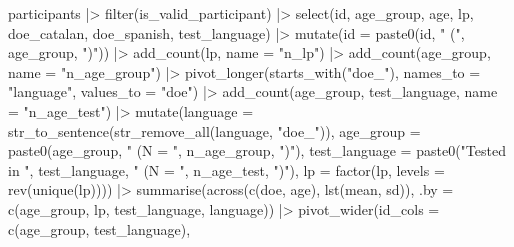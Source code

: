 \documentclass[
  letterpaper,
  DIV=11,
  numbers=noendperiod]{scrartcl}
\newenvironment{Shaded}{\begin{snugshade}}{\end{snugshade}}
\newcommand{\AttributeTok}[1]{\textcolor[rgb]{0.40,0.45,0.13}{#1}}
\newcommand{\FunctionTok}[1]{\textcolor[rgb]{0.28,0.35,0.67}{#1}}
\newcommand{\NormalTok}[1]{\textcolor[rgb]{0.00,0.23,0.31}{#1}}
\newcommand{\SpecialCharTok}[1]{\textcolor[rgb]{0.37,0.37,0.37}{#1}}
\newcommand{\StringTok}[1]{\textcolor[rgb]{0.13,0.47,0.30}{#1}}
\begin{document}
\begin{Shaded}
\begin{Highlighting}[]
\NormalTok{participants }\SpecialCharTok{|\textgreater{}} 
    \FunctionTok{filter}\NormalTok{(is\_valid\_participant) }\SpecialCharTok{|\textgreater{}} 
    \FunctionTok{select}\NormalTok{(id, age\_group, age, lp,}
\NormalTok{           doe\_catalan, doe\_spanish, test\_language) }\SpecialCharTok{|\textgreater{}} 
    \FunctionTok{mutate}\NormalTok{(}\AttributeTok{id =} \FunctionTok{paste0}\NormalTok{(id, }\StringTok{" ("}\NormalTok{, age\_group, }\StringTok{")"}\NormalTok{)) }\SpecialCharTok{|\textgreater{}}
    \FunctionTok{add\_count}\NormalTok{(lp, }
              \AttributeTok{name =} \StringTok{"n\_lp"}\NormalTok{) }\SpecialCharTok{|\textgreater{}} 
    \FunctionTok{add\_count}\NormalTok{(age\_group, }
              \AttributeTok{name =} \StringTok{"n\_age\_group"}\NormalTok{) }\SpecialCharTok{|\textgreater{}} 
    \FunctionTok{pivot\_longer}\NormalTok{(}\FunctionTok{starts\_with}\NormalTok{(}\StringTok{"doe\_"}\NormalTok{),}
                 \AttributeTok{names\_to =} \StringTok{"language"}\NormalTok{,}
                 \AttributeTok{values\_to =} \StringTok{"doe"}\NormalTok{) }\SpecialCharTok{|\textgreater{}}
    \FunctionTok{add\_count}\NormalTok{(age\_group,}
\NormalTok{              test\_language,}
              \AttributeTok{name =} \StringTok{"n\_age\_test"}\NormalTok{) }\SpecialCharTok{|\textgreater{}} 
    \FunctionTok{mutate}\NormalTok{(}\AttributeTok{language =} \FunctionTok{str\_to\_sentence}\NormalTok{(}\FunctionTok{str\_remove\_all}\NormalTok{(language, }\StringTok{"doe\_"}\NormalTok{)),}
           \AttributeTok{age\_group =} \FunctionTok{paste0}\NormalTok{(age\_group, }\StringTok{" (N = "}\NormalTok{, n\_age\_group, }\StringTok{")"}\NormalTok{),}
           \AttributeTok{test\_language =} \FunctionTok{paste0}\NormalTok{(}\StringTok{"Tested in "}\NormalTok{, test\_language, }
                               \StringTok{" (N = "}\NormalTok{, n\_age\_test, }\StringTok{")"}\NormalTok{),}
           \AttributeTok{lp =} \FunctionTok{factor}\NormalTok{(lp, }\AttributeTok{levels =} \FunctionTok{rev}\NormalTok{(}\FunctionTok{unique}\NormalTok{(lp))))  }\SpecialCharTok{|\textgreater{}} 
    \FunctionTok{summarise}\NormalTok{(}\FunctionTok{across}\NormalTok{(}\FunctionTok{c}\NormalTok{(doe, age), }\FunctionTok{lst}\NormalTok{(mean, sd)),}
              \AttributeTok{.by =} \FunctionTok{c}\NormalTok{(age\_group, lp, test\_language, language)) }\SpecialCharTok{|\textgreater{}} 
    \FunctionTok{pivot\_wider}\NormalTok{(}\AttributeTok{id\_cols =} \FunctionTok{c}\NormalTok{(age\_group, test\_language),}

\end{Highlighting}
\end{Shaded}
\end{document}
